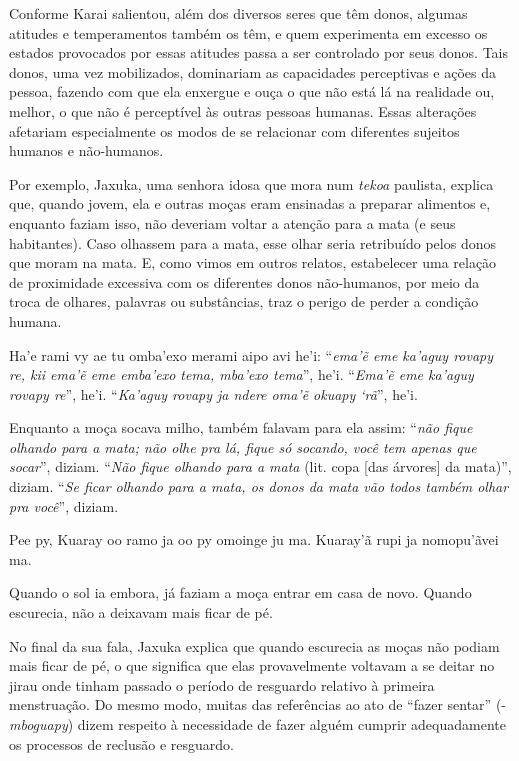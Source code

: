 Conforme Karai salientou, além dos diversos seres que têm donos, algumas
atitudes e temperamentos também os têm, e quem experimenta em excesso
os estados provocados por essas atitudes passa a ser controlado por
seus donos. Tais donos, uma vez mobilizados, dominariam as capacidades
perceptivas e ações da pessoa, fazendo com que ela enxergue e ouça o
que não está lá na realidade ou, melhor, o que não é perceptível às
outras pessoas humanas. Essas alterações afetariam especialmente os
modos de se relacionar com diferentes sujeitos humanos e não-humanos.

Por exemplo, Jaxuka, uma senhora idosa que mora num \emph{tekoa} paulista,
explica que, quando jovem, ela e outras moças eram ensinadas a preparar
alimentos e, enquanto faziam isso, não deveriam voltar a atenção para a
mata (e seus habitantes). Caso olhassem para a mata, esse olhar seria
retribuído pelos donos que moram na mata. E, como vimos em outros
relatos, estabelecer uma relação de proximidade excessiva com os
diferentes donos não-humanos, por meio da troca de olhares, palavras ou
substâncias, traz o perigo de perder a condição humana.  

\bigskip

\begin{paracol}{2}
\footnotesize
\bigskip
Ha'e rami vy ae tu omba'exo merami aipo avi he'i: ``\emph{ema'ẽ eme
ka'aguy rovapy re, kii ema'ẽ eme emba'exo tema, mba'exo tema}'', he'i.
``\emph{Ema'ẽ eme ka'aguy rovapy re}'', he'i. ``\emph{Ka'aguy rovapy ja
ndere oma'ẽ okuapy `rã}'', he'i.

\switchcolumn
Enquanto a moça socava milho, também falavam para ela assim: ``\emph{não
fique olhando para a mata; não olhe pra lá, fique só socando, você tem
apenas que socar}'', diziam. ``\emph{Não fique olhando para a mata}
(lit. copa [das árvores] da mata)'', diziam. ``\emph{Se ficar
olhando para a mata, os donos da mata vão todos também olhar pra
você}'', diziam.

\switchcolumn
Pee py, Kuaray oo ramo ja oo py omoinge ju ma. Kuaray’ã rupi ja
nomopu’ãvei ma. 

\switchcolumn
Quando o sol ia embora, já faziam a moça entrar em casa de novo. Quando
escurecia, não a deixavam mais ficar de pé.
\end{paracol}

\bigskip

No final da sua fala, Jaxuka explica que quando escurecia as moças não
podiam mais ficar de pé, o que significa que elas provavelmente
voltavam a se deitar no jirau onde tinham passado o período de
resguardo relativo à primeira menstruação. Do mesmo modo, muitas das
referências ao ato de ``fazer sentar'' (-\emph{mboguapy}) dizem respeito à
necessidade de fazer alguém cumprir adequadamente os processos de
reclusão e resguardo. 

